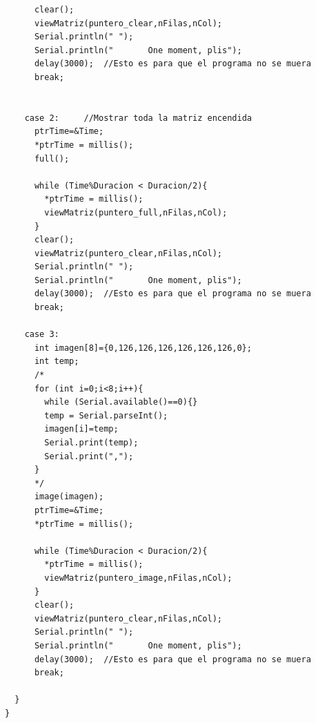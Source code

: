 \documentclass{article}
\begin{document}
\begin{lstlisting}
      clear();
      viewMatriz(puntero_clear,nFilas,nCol);
      Serial.println(" ");
      Serial.println("       One moment, plis");
      delay(3000);	//Esto es para que el programa no se muera
      break;
    
    
  	case 2:		//Mostrar toda la matriz encendida
      ptrTime=&Time;
      *ptrTime = millis();
      full();
      
      while (Time%Duracion < Duracion/2){    
        *ptrTime = millis();
        viewMatriz(puntero_full,nFilas,nCol);
      }
      clear();
      viewMatriz(puntero_clear,nFilas,nCol); 
      Serial.println(" ");
      Serial.println("       One moment, plis");
      delay(3000);	//Esto es para que el programa no se muera
      break;
     
    case 3:
      int imagen[8]={0,126,126,126,126,126,126,0};
      int temp;
      /*
      for (int i=0;i<8;i++){
      	while (Serial.available()==0){}
        temp = Serial.parseInt();
        imagen[i]=temp;
        Serial.print(temp);
        Serial.print(",");
      }
      */
      image(imagen);
      ptrTime=&Time;
      *ptrTime = millis();	
      
      while (Time%Duracion < Duracion/2){
        *ptrTime = millis();
        viewMatriz(puntero_image,nFilas,nCol);
      }
      clear();
      viewMatriz(puntero_clear,nFilas,nCol); 
      Serial.println(" ");
      Serial.println("       One moment, plis");
      delay(3000);	//Esto es para que el programa no se muera
      break;	
      
  }
}

\end{lstlisting}\\\\



\end{document}
